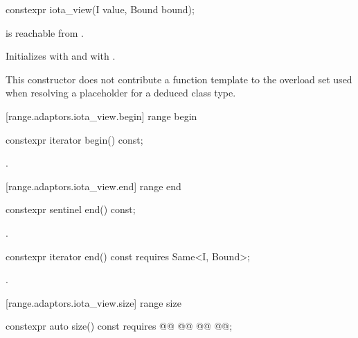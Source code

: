 %
\begin{itemdecl}
constexpr iota_view(I value, Bound bound);
\end{itemdecl}

\begin{itemdescr}
\pnum
\requires {} is reachable from .

\pnum
\effects Initializes  with  and  with
.

\pnum
\remarks This constructor does not contribute a function template to the overload
set used when resolving a placeholder for a deduced class
type.
\end{itemdescr}

[range.adaptors.iota_view.begin]{ range begin}

%
\begin{itemdecl}
constexpr iterator begin() const;
\end{itemdecl}

\begin{itemdescr}
\pnum
\returns {}.
\end{itemdescr}

[range.adaptors.iota_view.end]{ range end}

%
\begin{itemdecl}
constexpr sentinel end() const;
\end{itemdecl}

\begin{itemdescr}
\pnum
\returns {}.
\end{itemdescr}

%
\begin{itemdecl}
constexpr iterator end() const requires Same<I, Bound>;
\end{itemdecl}

\begin{itemdescr}
\pnum
\returns {}.
\end{itemdescr}

[range.adaptors.iota_view.size]{ range size}

%
\begin{itemdecl}
constexpr auto size() const requires @\oldtxt{\seebelow}@
  @@
  @@
  @@;
\end{itemdecl}


